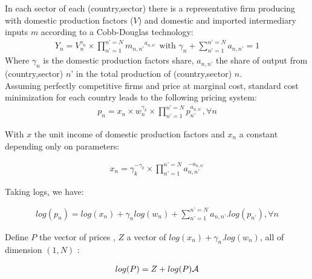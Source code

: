 \documentclass[11pt,a4paper]{article}
\begin{document}
In each sector of each (country,sector) there is a representative firm producing with domestic production factors ($V$) and domestic and imported intermediary inputs $m$ according to a Cobb-Douglas technology:
\begin{eqnarray*}
Y_n=V^{\gamma_n}_n \times \prod_{n’=1}^{n’=N} {m_{n,n’}}^{a_{n,n’}} \text{ with } \gamma_n +\sum_{n’=1}^{n’=N} {a_{n,n’}} =1
\end{eqnarray*}
Where $\gamma_n$ is the domestic production factors share, $a_{n,n’}$ the share of output from (country,sector) $n’$ in the total production of (country,sector) $n$. \\ 
Assuming perfectly competitive firms and price at marginal cost, standard cost minimization for each country leads to the following pricing system:
\begin{eqnarray*}
	p_n=x_n \times w_n^{\gamma_k} \times \prod_{n’=1}^{n’=N}p_{n’}^{a_{n,n’}}, \forall n 
\end{eqnarray*}

With $x$ the unit income of domestic production factors and $x_n$ a constant depending only on parameters:

\begin{eqnarray*}
	x_n=\gamma_k^{-\gamma_k} \times \prod_{n’=1}^{n’=N}a_{n,n’}^{-a_{n,n’}}
\end{eqnarray*}

Taking logs, we have:

\begin{eqnarray*}
	log(p_n) = log(x_n) + \gamma_n log(w_n) + \sum_{n’=1}^{n’=N}a_{n,n’}.log(p_{n’}), \forall n
\end{eqnarray*}

Define $P$ the vector of prices , $Z$ a vector of $log(x_n)+\gamma_n.log(w_n)$, all of dimension $(1,N)$ : 

\begin{eqnarray}
	log(P)=Z + log(P){\cal A}
	\label{eq:priceequation} 
\end{eqnarray}
\end{document}
